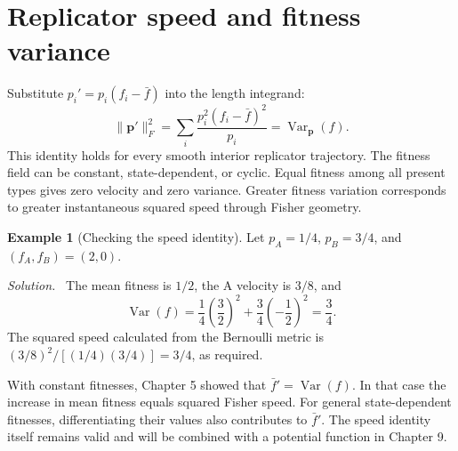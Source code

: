 \documentclass[11pt,oneside,openany]{book}
\theoremstyle{definition}
\newtheorem{example}{Example}[chapter]
\theoremstyle{remark}
\newenvironment{solution}{\par\smallskip\noindent\textit{Solution.}\ }{\par\smallskip}
\newcommand{\Var}{\operatorname{Var}}
\newcommand{\p}{\mathbf{p}}
\numberwithin{equation}{chapter}
\begin{document}
\section{Replicator speed and fitness variance}
Substitute $p_i'=p_i(f_i-\bar f)$ into the length integrand:
\begin{equation}\label{eq:speedvariance}
\boxed{\|\p'\|_F^2=\sum_i\frac{p_i^2(f_i-\bar f)^2}{p_i}
=\Var_\p(f).}
\end{equation}
This identity holds for every smooth interior replicator trajectory. The fitness field can be constant, state-dependent, or cyclic. Equal fitness among all present types gives zero velocity and zero variance. Greater fitness variation corresponds to greater instantaneous squared speed through Fisher geometry.

\begin{example}[Checking the speed identity]
Let $p_A=1/4$, $p_B=3/4$, and $(f_A,f_B)=(2,0)$.
\begin{solution}
The mean fitness is $1/2$, the A velocity is $3/8$, and
\[
\Var(f)=\frac14\left(\frac32\right)^2+\frac34\left(-\frac12\right)^2=\frac34.
\]
The squared speed calculated from the Bernoulli metric is $(3/8)^2/[(1/4)(3/4)]=3/4$, as required.
\end{solution}
\end{example}

With constant fitnesses, Chapter 5 showed that $\bar f'=\Var(f)$. In that case the increase in mean fitness equals squared Fisher speed. For general state-dependent fitnesses, differentiating their values also contributes to $\bar f'$. The speed identity itself remains valid and will be combined with a potential function in Chapter 9.

\FloatBarrier
\end{document}
